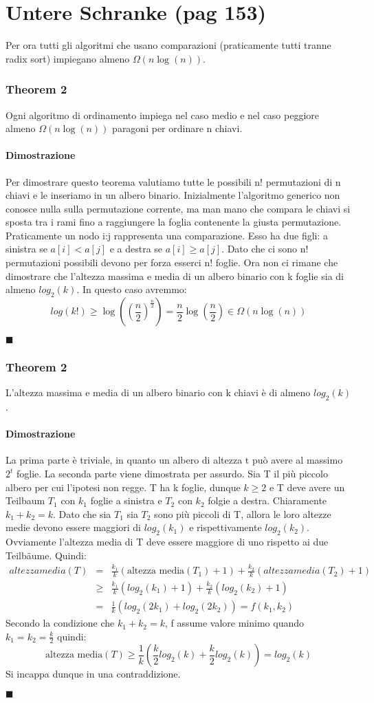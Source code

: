 \documentclass[a4paper]{book}
\newenvironment{mytheorem}[1]{\subsubsection*{Theorem #1}}{\begin{flushright}$\blacksquare$\end{flushright}}
\begin{document}
\section{Untere Schranke (pag 153)}
Per ora tutti gli algoritmi che usano comparazioni (praticamente tutti tranne radix sort) impiegano almeno $\Omega (n \log (n))$. 
\begin{mytheorem}{2}
Ogni algoritmo di ordinamento impiega nel caso medio e nel caso peggiore almeno $\Omega (n \log (n))$ paragoni per ordinare n chiavi.
\paragraph*{Dimostrazione}
Per dimostrare questo teorema valutiamo tutte le possibili n! permutazioni di n chiavi e le inseriamo in un albero binario. Inizialmente l'algoritmo generico non conosce nulla sulla permutazione corrente, ma man mano che compara le chiavi si sposta tra i rami fino a raggiungere la foglia contenente la giusta permutazione. Praticamente un nodo i:j rappresenta una comparazione. Esso ha due figli: a sinistra se $a[i]<a[j]$ e a destra se $a[i] \geq a[j]$. Dato che ci sono n! permutazioni possibili devono per forza esserci n! foglie. Ora non ci rimane che dimostrare che l'altezza massima e media di un albero binario con k foglie sia di almeno $log_2 (k)$. In questo caso avremmo:
$$ log (k!) \geq \log ((\frac{n}{2})^{\frac{n}{2}}) = \frac{n}{2} \log (\frac{n}{2}) \in \Omega (n \log (n))$$
\end{mytheorem}
\begin{mytheorem}{2}
L'altezza massima e media di un albero binario con k chiavi è di almeno $ log_2 (k)$.
\paragraph*{Dimostrazione}
La prima parte è triviale, in quanto un albero di altezza t può avere al massimo $2^t$ foglie. La seconda parte viene dimostrata per assurdo. Sia T il più piccolo albero per cui l'ipotesi non regge. T ha k foglie, dunque $k \geq 2$ e T deve avere un Teilbaum $T_1$ con $k_1$ foglie a sinistra e $T_2$ con $k_2$ folgie a destra. Chiaramente $k_1+k_2=k$. Dato che sia $T_1$ sia $T_2$ sono più piccoli di T, allora le loro altezze medie devono essere maggiori di $log_2(k_1)$ e rispettivamente $log_2 (k_2)$. Ovviamente l'altezza media di T deve essere maggiore di uno rispetto ai due Teilbäume. Quindi:
\begin{eqnarray}
 altezza media(T) &=&  \frac{k_1}{k}(\mbox{altezza media}(T_1)+1)+\frac{k_2}{k}(altezza media(T_2)+1)      \nonumber \\
   &\geq & \frac{k_1}{k}(log_2(k_1)+1)+\frac{k_2}{k}(log_2(k_2)+1) \nonumber \\
   &=&\frac{1}{k}(log_2(2k_1)+log_2(2k_2)) = f(k_1,k_2)
\end{eqnarray}
Secondo la condizione che $k_1+k_2=k$, f assume valore minimo quando $k_1=k_2=\frac{k}{2}$ quindi:
$$ \mbox{altezza media}(T) \geq \frac{1}{k}(\frac{k}{2} log_2(k)+\frac{k}{2} log_2(k))=log_2 (k)$$
Si incappa dunque in una contraddizione.
\end{mytheorem}
\end{document}
